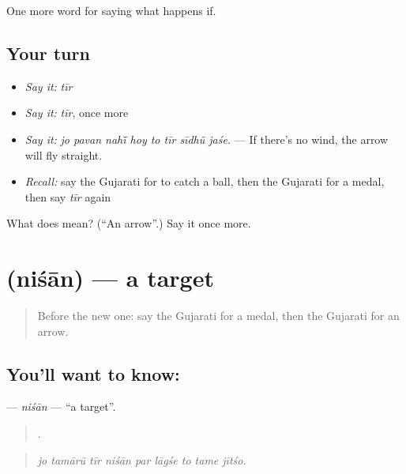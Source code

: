 \begin{grammarlens}[title={What you've built}]
One more word for saying what happens if.
\end{grammarlens}

\subsection*{Your turn}
\begin{itemize}
\raggedright
  \item \emph{Say it:} \emph{tīr}
  \item \emph{Say it:} \emph{tīr}, once more
  \item \emph{Say it:} \emph{jo pavan nahī̃ hoy to tīr sīdhũ jaśe.} — If there's no wind, the arrow will fly straight.
  \item \emph{Recall:} say the Gujarati for to catch a ball, then the Gujarati for a medal, then say \emph{tīr} again
\end{itemize}

\begin{tcolorbox}[breakable,colback=teal!4,colframe=teal!35!black,title={Before you move on}]
What does  mean? (\textquotedblleft{}An arrow\textquotedblright{}.) Say it once more.
\end{tcolorbox}
\section[\texorpdfstring{\gu{નિશાન} (niśān)}{નિશાન (niśān)}]{ (niśān) — a target}

\label{lesson:GU-C550-nisan}



\begin{quote}
Before the new one: say the Gujarati for a medal, then the Gujarati for an arrow.
\end{quote}

\subsection*{You'll want to know: }
\textbf{} — \emph{niśān} — \textquotedblleft{}a target\textquotedblright{}.

\begin{quote}
        .
\end{quote}

\begin{quote}
\emph{jo tamārũ tīr niśān par lāgśe to tame jītśo.}
\end{quote}

